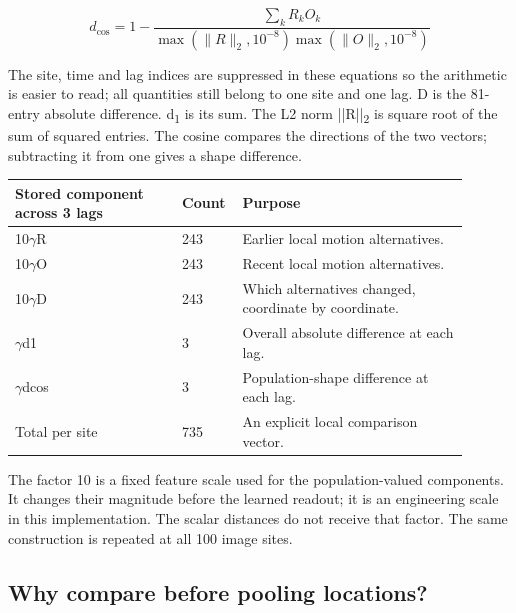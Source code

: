 \documentclass[11pt,letterpaper]{article}
\begin{document}
\begin{equation}d_{\cos}=1-\frac{\sum_k R_kO_k}{\max(\|R\|_2,10^{-8})\max(\|O\|_2,10^{-8})}\end{equation}

The site, time and lag indices are suppressed in these equations so the arithmetic is easier to read; all quantities still belong to one site and one lag. D is the 81-entry absolute difference. d\textsubscript{1} is its sum. The L2 norm ||R||\textsubscript{2} is square root of the sum of squared entries. The cosine compares the directions of the two vectors; subtracting it from one gives a shape difference.


\begin{center}\small\renewcommand{\arraystretch}{1.16}\setlength{\tabcolsep}{4pt}\begin{tabular}{p{0.349\linewidth}p{0.088\linewidth}p{0.463\linewidth}}\toprule

\textbf{Stored component across 3 lags} & \textbf{Count} & \textbf{Purpose} \\

\midrule

10\(\gamma\)R & 243 & Earlier local motion alternatives. \\

10\(\gamma\)O & 243 & Recent local motion alternatives. \\

10\(\gamma\)D & 243 & Which alternatives changed, coordinate by coordinate. \\

\(\gamma\)d1 & 3 & Overall absolute difference at each lag. \\

\(\gamma\)dcos & 3 & Population-shape difference at each lag. \\

Total per site & 735 & An explicit local comparison vector. \\

\bottomrule\end{tabular}\end{center}

The factor 10 is a fixed feature scale used for the population-valued components. It changes their magnitude before the learned readout; it is an engineering scale in this implementation. The scalar distances do not receive that factor. The same construction is repeated at all 100 image sites.


\subsection*{Why compare before pooling locations?}
\end{document}
